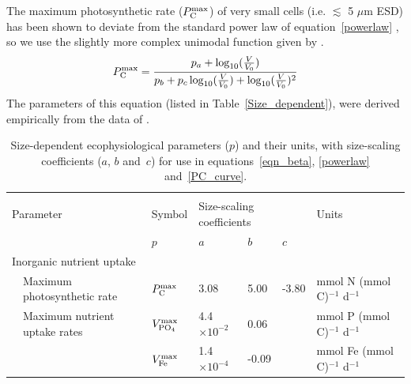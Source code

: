 \documentclass[gmd, manuscript]{copernicus}
\begin{document}
{The maximum photosynthetic rate ($P^{\rm max}_{\rm C}$) of very small cells (i.e. $\lesssim$ 5 $\mu$m ESD) has been shown to deviate from the standard power law of equation~\ref{powerlaw} \citep{Raven:1994,Bec:2008,Finkel:2010}, so we use the slightly more complex unimodal function given by \citet{Ward:2016}.
%
\begin{equation}
\label{PC_curve}
P^{\rm max}_{\rm C} = \frac{p_a + \log_{10}(\frac{V}{V_0})}{p_b + p_c \log_{10}(\frac{V}{V_0})+ \log_{10}(\frac{V}{V_0})^2}
\end{equation}
%
The parameters of this equation (listed in Table~\ref{Size_dependent}), were derived empirically from the data of \citet{Maranon:2013}.

\begin{table}[htp!]
\footnotesize
\caption{Size-dependent ecophysiological parameters ($p$) and their units, with size-scaling coefficients ($a$, $b$ and~$c$) for use in equations~\ref{eqn_beta}, \ref{powerlaw} and~\ref{PC_curve}.}
\begin{tabular*}{1.0\textwidth}{@{\extracolsep{\fill}}lllllll}
\hline \\ [-2ex]
\multicolumn{2}{l}{Parameter} & Symbol & \multicolumn{3}{l}{Size-scaling coefficients} & Units \\ 
& & $p$ & $a$ & $b$ & $c$ & \\ 
\multicolumn{7}{l}{{Inorganic nutrient uptake}}\\ 
& Maximum photosynthetic rate & $P^{\rm max}_{\rm C}$ & 3.08 & 5.00 & -3.80 & mmol N (mmol C)$^{-1}$ d$^{-1}$ \\ 
& Maximum nutrient uptake rates  & $V^{\rm max}_{\rm PO_4}$ & 4.4$\times10^{-2}$ & 0.06 & & mmol P (mmol C)$^{-1}$ d$^{-1}$ \\ 
& & $V^{\rm max}_{\rm Fe}$ & 1.4$\times10^{-4}$ & -0.09 & & mmol Fe (mmol C)$^{-1}$ d$^{-1}$ \\ 

\end{tabular*}
\end{table}}
\end{document}
